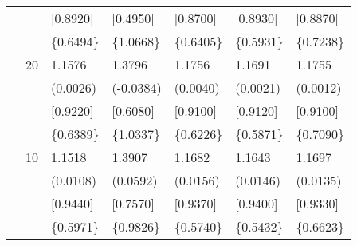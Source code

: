 \begin{table}[ht]
\begin{tabular}{lllllll}
&&[0.8920]&[0.4950]&[0.8700]&[0.8930]&[0.8870]\\
&&\{0.6494\}&\{1.0668\}&\{0.6405\}&\{0.5931\}&\{0.7238\}\\
&20&1.1576&1.3796&1.1756&1.1691&1.1755\\
&&(0.0026)&(-0.0384)&(0.0040)&(0.0021)&(0.0012)\\
&&[0.9220]&[0.6080]&[0.9100]&[0.9120]&[0.9100]\\
&&\{0.6389\}&\{1.0337\}&\{0.6226\}&\{0.5871\}&\{0.7090\}\\
&10&1.1518&1.3907&1.1682&1.1643&1.1697\\
&&(0.0108)&(0.0592)&(0.0156)&(0.0146)&(0.0135)\\
&&[0.9440]&[0.7570]&[0.9370]&[0.9400]&[0.9330]\\
&&\{0.5971\}&\{0.9826\}&\{0.5740\}&\{0.5432\}&\{0.6623\}\\
\hline
\end{tabular}
\end{table}

